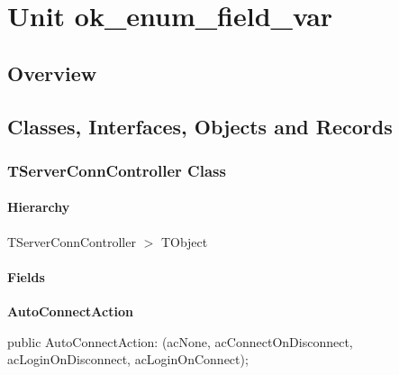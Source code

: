 \documentclass{report}
\newif\ifpdf
\begin{document}
\label{toc}\tableofcontents
\newpage
\newlength{\tmplength}
\chapter{Unit ok{\_}enum{\_}field{\_}var}
\label{ok_enum_field_var}
\section{Overview}
\begin{description}
\item[\texttt{\begin{ttfamily}TServerConnController\end{ttfamily} Class}]
\end{description}
\section{Classes, Interfaces, Objects and Records}
\ifpdf
\subsection*{\large{\textbf{TServerConnController Class}}\normalsize\hspace{1ex}\hrulefill}
\else
\subsection*{TServerConnController Class}
\fi
\label{ok_enum_field_var.TServerConnController}
\subsubsection*{\large{\textbf{Hierarchy}}\normalsize\hspace{1ex}\hfill}
TServerConnController {$>$} TObject
\subsubsection*{\large{\textbf{Fields}}\normalsize\hspace{1ex}\hfill}
\begin{list}{}{
\setlength{\itemindent}{0cm}
\setlength{\listparindent}{0cm}
\setlength{\leftmargin}{\evensidemargin}
\addtolength{\leftmargin}{\tmplength}
\settowidth{\labelsep}{X}
\addtolength{\leftmargin}{\labelsep}
\setlength{\labelwidth}{\tmplength}
}
\label{ok_enum_field_var.TServerConnController-AutoConnectAction}
\item[\textbf{AutoConnectAction}\hfill]
\ifpdf
\begin{flushleft}
\fi
\begin{ttfamily}
public AutoConnectAction: (acNone,
                        acConnectOnDisconnect,
                        acLoginOnDisconnect,
                        acLoginOnConnect);\end{ttfamily}

\ifpdf
\end{flushleft}
\fi


\par  \end{list}
\end{document}
